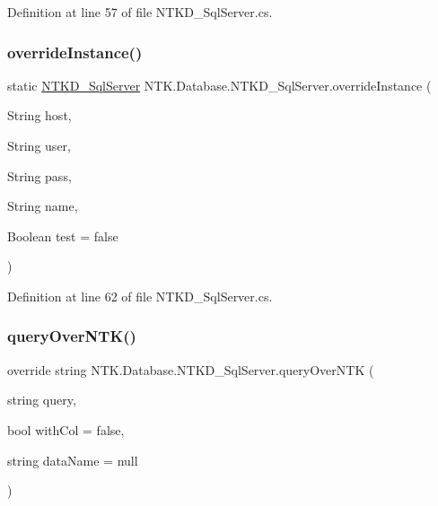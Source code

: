 Definition at line 57 of file N\+T\+K\+D\+\_\+\+Sql\+Server.\+cs.

\mbox{\label{class_n_t_k_1_1_database_1_1_n_t_k_d___sql_server_a3ea3acd36aa429e78880129d5334850a}} 
\subsubsection{\texorpdfstring{overrideInstance()}{overrideInstance()}}
{\footnotesize\ttfamily static \mbox{\hyperlink{class_n_t_k_1_1_database_1_1_n_t_k_d___sql_server}{N\+T\+K\+D\+\_\+\+Sql\+Server}} N\+T\+K.\+Database.\+N\+T\+K\+D\+\_\+\+Sql\+Server.\+override\+Instance (\begin{DoxyParamCaption}\item[{String}]{host,  }\item[{String}]{user,  }\item[{String}]{pass,  }\item[{String}]{name,  }\item[{Boolean}]{test = {\ttfamily false} }\end{DoxyParamCaption})\hspace{0.3cm}{\ttfamily [static]}}



Definition at line 62 of file N\+T\+K\+D\+\_\+\+Sql\+Server.\+cs.

\mbox{\label{class_n_t_k_1_1_database_1_1_n_t_k_d___sql_server_a86c2623990b3514fd01d4bced7e81e34}} 
\subsubsection{\texorpdfstring{queryOverNTK()}{queryOverNTK()}}
{\footnotesize\ttfamily override string N\+T\+K.\+Database.\+N\+T\+K\+D\+\_\+\+Sql\+Server.\+query\+Over\+N\+TK (\begin{DoxyParamCaption}\item[{string}]{query,  }\item[{bool}]{with\+Col = {\ttfamily false},  }\item[{string}]{data\+Name = {\ttfamily null} }\end{DoxyParamCaption})}



